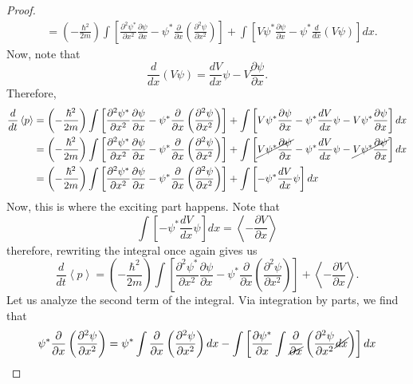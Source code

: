 \begin{sol}
\begin{enumerate}[label=\textbf{(\alph*)}]
\begin{proof}
\begin{align*}
    &= \left(-\frac{\hbar^2}{2m}\right)\int\left[\frac{\partial^2\psi^*}{\partial x^2}\frac{\partial \psi}{\partial x} - \psi^*\frac{\partial}{\partial x}\left(\frac{\partial^2\psi}{\partial x^2}\right)\right] + \int\left[V\psi^*\frac{\partial \psi}{\partial x} - \psi^*\frac{d}{dx}(V\psi)\right]dx.
\end{align*}
Now, note that 
\[\frac{d}{dx}(V\psi) = \frac{dV}{dx}\psi - V\frac{\partial \psi}{\partial x}.\]
Therefore, 
\begin{align*}
    \frac{d}{dt}\left<p\right> &= \left(-\frac{\hbar^2}{2m}\right)\int\left[\frac{\partial^2\psi^*}{\partial x^2}\frac{\partial \psi}{\partial x} - \psi^*\frac{\partial}{\partial x}\left(\frac{\partial^2\psi}{\partial x^2}\right)\right] + \int\left[V\psi^*\frac{\partial \psi}{\partial x} - \psi^*\frac{dV}{dx}\psi - V\psi^*\frac{\partial \psi}{\partial x}\right]dx\\
    &= \left(-\frac{\hbar^2}{2m}\right)\int\left[\frac{\partial^2\psi^*}{\partial x^2}\frac{\partial \psi}{\partial x} - \psi^*\frac{\partial}{\partial x}\left(\frac{\partial^2\psi}{\partial x^2}\right)\right] + \int\left[\cancel{V\psi^*\frac{\partial \psi}{\partial x}} - \psi^*\frac{dV}{dx}\psi - \cancel{V\psi^*\frac{\partial \psi}{\partial x}}\right]dx\\
    &= \left(-\frac{\hbar^2}{2m}\right)\int\left[\frac{\partial^2\psi^*}{\partial x^2}\frac{\partial \psi}{\partial x} - \psi^*\frac{\partial}{\partial x}\left(\frac{\partial^2\psi}{\partial x^2}\right)\right] + \int\left[ - \psi^*\frac{dV}{dx}\psi\right]dx
\end{align*}
Now, this is where the exciting part happens. Note that 
\[\int\left[ - \psi^*\frac{dV}{dx}\psi\right]dx = \left<-\frac{\partial V}{\partial x}\right>\]
therefore, rewriting the integral once again gives us 
\[\frac{d}{dt}\left<p\right> = \left(-\frac{\hbar^2}{2m}\right)\int\left[\frac{\partial^2\psi^*}{\partial x^2}\frac{\partial \psi}{\partial x} - \psi^*\frac{\partial}{\partial x}\left(\frac{\partial^2\psi}{\partial x^2}\right)\right] + \left<-\frac{\partial V}{\partial x}\right>.\]
Let us analyze the second term of the integral. Via integration by parts, we find that 
\begin{align*}
    \psi^*\frac{\partial}{\partial x}\left(\frac{\partial^2\psi}{\partial x^2}\right) &= \psi^*\int\frac{\partial}{\partial x}\left(\frac{\partial^2\psi}{\partial x^2}\right)dx - \int\left[\frac{\partial \psi^*}{\partial x}\int \frac{\partial}{\cancel{\partial x}}\left(\frac{\partial^2\psi}{\partial x^2}\cancel{dx}\right)\right]dx\\

\end{align*}
\end{proof}
\end{enumerate}
\end{sol}
